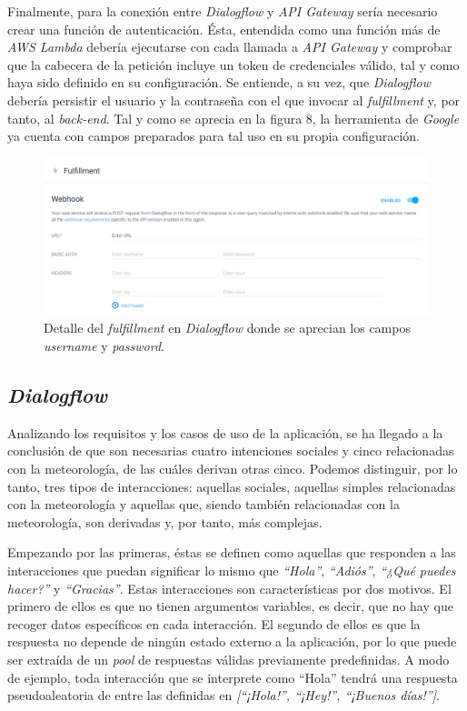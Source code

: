 \documentclass[11pt,spanish,listoffigures]{tfgetsinf}
\begin{document}
Finalmente, para la conexión entre \textit{Dialogflow} y \textit{API Gateway} sería necesario crear una función de autenticación. Ésta, entendida como una función más de \textit{AWS Lambda} debería ejecutarse con cada llamada a \textit{API Gateway} y comprobar que la cabecera de la petición incluye un token de credenciales válido, tal y como haya sido definido en su configuración. Se entiende, a su vez, que \textit{Dialogflow} debería persistir el usuario y la contraseña con el que invocar al \textit{fulfillment} y, por tanto, al \textit{back-end}. Tal y como se aprecia en la figura 8, la herramienta de \textit{Google} ya cuenta con campos preparados para tal uso en su propia configuración.

\begin{figure}[h!]
    \centering
    \includegraphics[width=1\textwidth]{images/img08.png}
    \caption{Detalle del \textit{fulfillment} en \textit{Dialogflow} donde se aprecian los campos \textit{username} y \textit{password}.}
    \label{fig:auth-dialogflow}
\end{figure}

\subsection{\textit{Dialogflow}}
\label{subsec:design-dialogflow}

Analizando los requisitos y los casos de uso de la aplicación, se ha llegado a la conclusión de que son necesarias cuatro intenciones sociales y cinco relacionadas con la meteorología, de las cuáles derivan otras cinco. Podemos distinguir, por lo tanto, tres tipos de interacciones: aquellas sociales, aquellas simples relacionadas con la meteorología y aquellas que, siendo también relacionadas con la meteorología, son derivadas y, por tanto, más complejas.

Empezando por las primeras, éstas se definen como aquellas que responden a las interacciones que puedan significar lo mismo que \textit{“Hola”}, \textit{“Adiós”}, \textit{“¿Qué puedes hacer?”} y \textit{“Gracias”}. Estas interacciones son características por dos motivos. El primero de ellos es que no tienen argumentos variables, es decir, que no hay que recoger datos específicos en cada interacción. El segundo de ellos es que la respuesta no depende de ningún estado externo a la aplicación, por lo que puede ser extraída de un \textit{pool} de respuestas válidas previamente predefinidas. A modo de ejemplo, toda interacción que se interprete como “Hola” tendrá una respuesta pseudoaleatoria de entre las definidas en \textit{[“¡Hola!”, “¡Hey!”, “¡Buenos días!”]}. 
\end{document}
